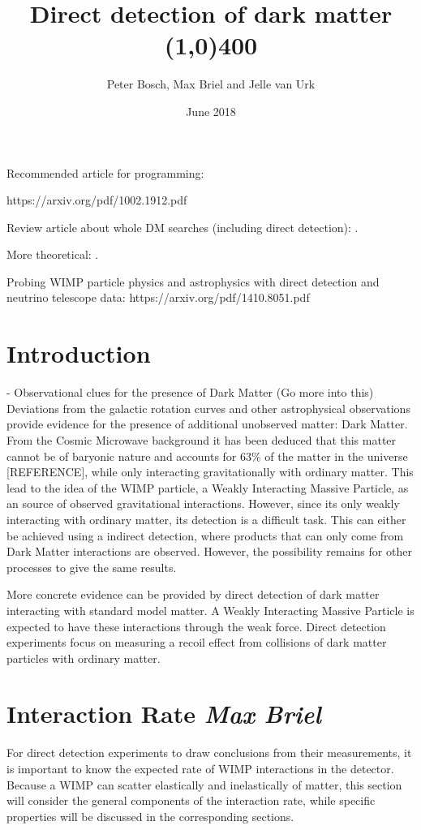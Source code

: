 \documentclass{article}
\title{\textbf{Direct detection of dark matter}\\ \line(1,0){400}}
\author{Peter Bosch, Max Briel and Jelle van Urk}
\date{June 2018}
\begin{document}
\maketitle
\newpage
\tableofcontents
\newpage
Recommended article for programming:

https://arxiv.org/pdf/1002.1912.pdf

Review article about whole DM searches (including direct detection): \cite{Roszkowski:2017nbc}.

More theoretical: \cite{Queiroz:2017kxt}.

Probing WIMP particle physics and astrophysics with direct detection and neutrino telescope data:
https://arxiv.org/pdf/1410.8051.pdf

\section{Introduction}


- Observational clues for the presence of Dark Matter (Go more into this) 
Deviations from the galactic rotation curves and other astrophysical observations provide evidence for the presence of additional unobserved matter: Dark Matter. From the Cosmic Microwave background it has been deduced that this matter cannot be of baryonic nature and accounts for 63\% of the matter in the universe [REFERENCE], while only interacting gravitationally with ordinary matter. 
This lead to the idea of the WIMP particle, a Weakly Interacting Massive Particle, as an source of observed gravitational interactions. 
However, since its only weakly interacting with ordinary matter, its detection is a difficult task. This can either be achieved using a indirect detection, where products that can only come from Dark Matter interactions are observed. However, the possibility remains for other processes to give the same results. 

More concrete evidence can be provided by direct detection of dark matter interacting with standard model matter. A Weakly Interacting Massive Particle is expected to have these interactions through the weak force. Direct detection experiments focus on measuring a recoil effect from collisions of dark matter particles with ordinary matter.

\FloatBarrier
\section{Interaction Rate \small{\textit{Max Briel}}}

For direct detection experiments to draw conclusions from their measurements, it is important to know the expected rate of WIMP interactions in the detector. Because a WIMP can scatter elastically and inelastically of matter, this section will consider the general components of the interaction rate, while specific properties will be discussed in the corresponding sections. 
\end{document}
